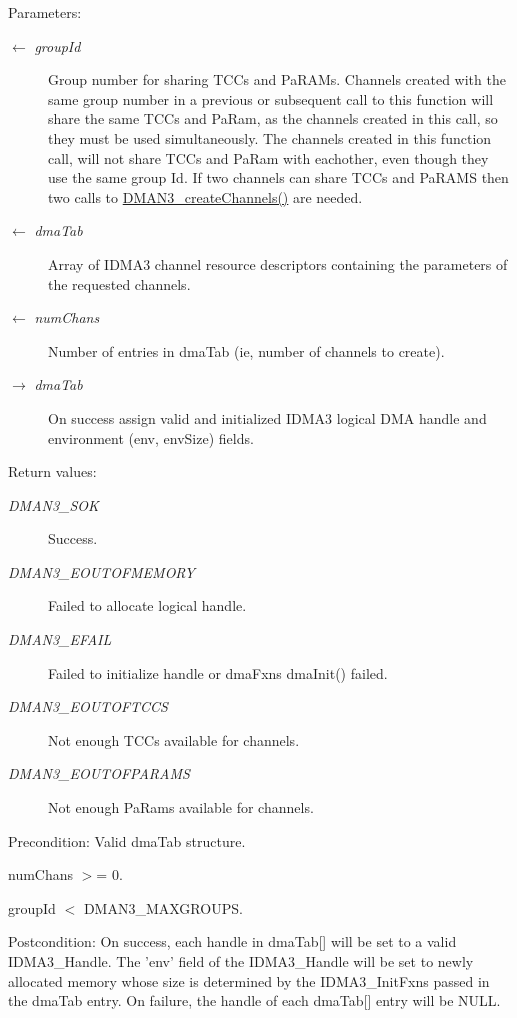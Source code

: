 \begin{Desc}
\item[Parameters:]
\begin{description}
\item[\mbox{$\leftarrow$} {\em group\-Id}]Group number for sharing TCCs and Pa\-RAMs. Channels created with the same group number in a previous or subsequent call to this function will share the same TCCs and Pa\-Ram, as the channels created in this call, so they must be used simultaneously. The channels created in this function call, will not share TCCs and Pa\-Ram with eachother, even though they use the same group Id. If two channels can share TCCs and Pa\-RAMS then two calls to \hyperlink{group___d_s_p_d_m_a_n3_gee927c5ad460e5e5a122471ccb047db1}{DMAN3\_\-create\-Channels()} are needed. \item[\mbox{$\leftarrow$} {\em dma\-Tab}]Array of IDMA3 channel resource descriptors containing the parameters of the requested channels. \item[\mbox{$\leftarrow$} {\em num\-Chans}]Number of entries in dma\-Tab (ie, number of channels to create). \item[\mbox{$\rightarrow$} {\em dma\-Tab}]On success assign valid and initialized IDMA3 logical DMA handle and environment (env, env\-Size) fields.\end{description}
\end{Desc}
\begin{Desc}
\item[Return values:]
\begin{description}
\item[{\em DMAN3\_\-SOK}]Success. \item[{\em DMAN3\_\-EOUTOFMEMORY}]Failed to allocate logical handle. \item[{\em DMAN3\_\-EFAIL}]Failed to initialize handle or dma\-Fxns dma\-Init() failed. \item[{\em DMAN3\_\-EOUTOFTCCS}]Not enough TCCs available for channels. \item[{\em DMAN3\_\-EOUTOFPARAMS}]Not enough Pa\-Rams available for channels.\end{description}
\end{Desc}
\begin{Desc}
\item[Precondition:]Valid dma\-Tab structure. 

num\-Chans $>$= 0. 

group\-Id $<$ DMAN3\_\-MAXGROUPS.\end{Desc}
\begin{Desc}
\item[Postcondition:]On success, each handle in dma\-Tab\mbox{[}\mbox{]} will be set to a valid IDMA3\_\-Handle. The 'env' field of the IDMA3\_\-Handle will be set to newly allocated memory whose size is determined by the IDMA3\_\-Init\-Fxns passed in the dma\-Tab entry. On failure, the handle of each dma\-Tab\mbox{[}\mbox{]} entry will be NULL. \end{Desc}
